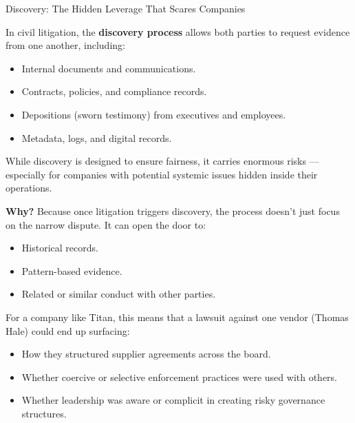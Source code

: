 \begin{HistoricalSidebar}{Discovery: The Hidden Leverage That Scares Companies}

    In civil litigation, the \textbf{discovery process} allows both parties to request evidence from one another, including:

    \medskip

    \begin{itemize}
        \item Internal documents and communications.
        \item Contracts, policies, and compliance records.
        \item Depositions (sworn testimony) from executives and employees.
        \item Metadata, logs, and digital records.
    \end{itemize}

    \medskip
    
    While discovery is designed to ensure fairness, it carries enormous risks — especially for companies with potential systemic issues hidden inside their operations.
    
    \medskip
    
    \textbf{Why?} Because once litigation triggers discovery, the process doesn’t just focus on the narrow dispute.
    It can open the door to:

    \medskip

    \begin{itemize}
        \item Historical records.
        \item Pattern-based evidence.
        \item Related or similar conduct with other parties.
    \end{itemize}

    \medskip
    
    For a company like Titan, this means that a lawsuit against one vendor (Thomas Hale) could end up surfacing:

    \medskip

    \begin{itemize}
        \item How they structured supplier agreements across the board.
        \item Whether coercive or selective enforcement practices were used with others.
        \item Whether leadership was aware or complicit in creating risky governance structures.
    \end{itemize}
    

\end{HistoricalSidebar}
